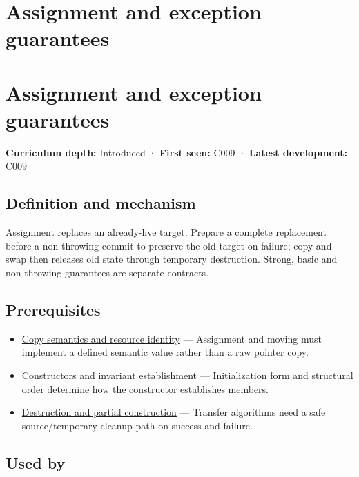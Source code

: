 \hypertarget{appendix-bea6beb5350f}{}
\section*{Assignment and exception guarantees}
\section{Assignment and exception guarantees}\label{appendix-bea6beb5350f-assignment-and-exception-guarantees}

\textbf{Curriculum depth:} Introduced · \textbf{First seen:} C009 · \textbf{Latest development:} C009

\subsection{Definition and mechanism}\label{appendix-bea6beb5350f-definition-and-mechanism}

Assignment replaces an already-live target. Prepare a complete replacement before a non-throwing commit to preserve the old target on failure; copy-and-swap then releases old state through temporary destruction. Strong, basic and non-throwing guarantees are separate contracts.

\subsection{Prerequisites}\label{appendix-bea6beb5350f-prerequisites}

\begin{itemize}
\tightlist
\item
  \hyperref[appendix-1340cd1ce582]{Copy semantics and resource identity} --- Assignment and moving must implement a defined semantic value rather than a raw pointer copy.
\item
  \hyperref[appendix-7f8ec83d0886]{Constructors and invariant establishment} --- Initialization form and structural order determine how the constructor establishes members.
\item
  \hyperref[appendix-9bfe377cef7a]{Destruction and partial construction} --- Transfer algorithms need a safe source/temporary cleanup path on success and failure.
\end{itemize}

\subsection{Used by}\label{appendix-bea6beb5350f-used-by}

